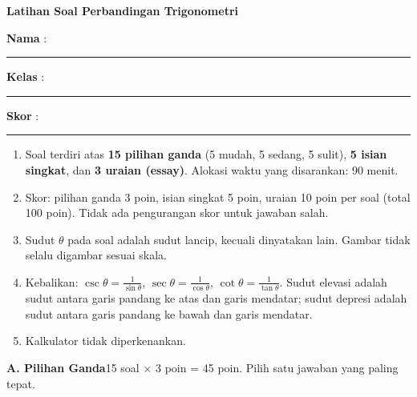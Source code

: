 \documentclass[a4paper,11pt]{article}
\newcommand{\dis}{\displaystyle}
\newcounter{no}
\newcommand{\bagian}[2]{\par\Needspace{6\baselineskip}\vspace{1.0em}\noindent
  \begin{tcolorbox}[colback=navy,colframe=navy,coltext=white,boxrule=0pt,arc=2pt,left=6pt,right=6pt,top=3pt,bottom=3pt]
  \textbf{#1}\hfill{\small #2}\end{tcolorbox}\setcounter{no}{0}\par\vspace{-0.3em}}
\begin{document}
\thispagestyle{fancy}

\begin{center}
  {\color{navy}\fontsize{22}{26}\selectfont\bfseries Latihan Soal Perbandingan Trigonometri\par}
\end{center}
\vspace{2pt}
\begin{tcolorbox}[colback=softbg,colframe=navy!40,boxrule=0.6pt,arc=3pt,left=8pt,right=8pt,top=5pt,bottom=5pt]
\noindent\textbf{Nama} : \rule{4.6cm}{0.4pt}\hfill\textbf{Kelas} : \rule{2.2cm}{0.4pt}\hfill\textbf{Skor} : \rule{2.2cm}{0.4pt}
\end{tcolorbox}
\vspace{2pt}
\begin{tcolorbox}[colback=white,colframe=teal,boxrule=0.8pt,arc=3pt,left=8pt,right=8pt,top=4pt,bottom=4pt,title={\bfseries Petunjuk Pengerjaan},coltitle=white,fonttitle=\small]
\small
\begin{enumerate}[leftmargin=1.4em,itemsep=1pt,topsep=1pt]
\item Soal terdiri atas \textbf{15 pilihan ganda} (5 mudah, 5 sedang, 5 sulit), \textbf{5 isian singkat}, dan \textbf{3 uraian (essay)}. Alokasi waktu yang disarankan: 90 menit.
\item Skor: pilihan ganda 3 poin, isian singkat 5 poin, uraian 10 poin per soal (total 100 poin). Tidak ada pengurangan skor untuk jawaban salah.
\item Sudut $\theta$ pada soal adalah sudut lancip, kecuali dinyatakan lain. Gambar tidak selalu digambar sesuai skala.
\item Kebalikan: $\csc\theta=\dis\frac{1}{\sin\theta}$, $\sec\theta=\dis\frac{1}{\cos\theta}$, $\cot\theta=\dis\frac{1}{\tan\theta}$. Sudut elevasi adalah sudut antara garis pandang ke atas dan garis mendatar; sudut depresi adalah sudut antara garis pandang ke bawah dan garis mendatar.
\item Kalkulator tidak diperkenankan.
\end{enumerate}
\end{tcolorbox}

\bagian{A. Pilihan Ganda}{15 soal $\times$ 3 poin = 45 poin. Pilih satu jawaban yang paling tepat.}
\end{document}
